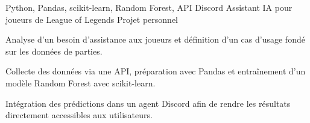 
\begin{cventries}
  \cventry
    {Python, Pandas, scikit-learn, Random Forest, API Discord}
    {Assistant IA pour joueurs de League of Legends}
    {Projet personnel}
    {}
    {
      \begin{cvitems}
        \item {Analyse d’un besoin d’assistance aux joueurs et définition d’un cas d’usage fondé sur les données de parties.}
        \item {Collecte des données via une API, préparation avec Pandas et entraînement d’un modèle Random Forest avec scikit-learn.}
        \item {Intégration des prédictions dans un agent Discord afin de rendre les résultats directement accessibles aux utilisateurs.}
      \end{cvitems}
    }
\end{cventries}
